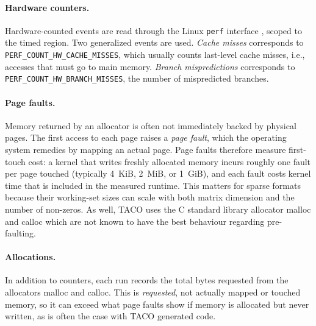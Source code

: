 \paragraph{Hardware counters.}
Hardware-counted events are read through the Linux \texttt{perf} interface
\cite{perf}, scoped to the timed region. Two generalized events are used.
\emph{Cache misses} corresponds to \texttt{PERF\_COUNT\_HW\_CACHE\_MISSES}, which
usually counts last-level cache misses, i.e., accesses that must go to main memory. \emph{Branch mispredictions} corresponds to
\texttt{PERF\_COUNT\_HW\_BRANCH\_MISSES}, the number of mispredicted branches.

\paragraph{Page faults.}
Memory returned by an allocator is often not immediately backed by physical pages.
The first access to each page raises a \emph{page fault}, which the operating
system remedies by mapping an actual page. Page faults therefore measure
first-touch cost: a kernel that writes freshly allocated memory incurs roughly one
fault per page touched (typically 4~KiB, 2~MiB, or 1~GiB), and each fault costs kernel time that is
included in the measured runtime. This matters for sparse formats because
their working-set sizes can scale with both matrix dimension and the number of non-zeros. As well, TACO uses the C standard library allocator malloc and calloc
which are not known to have the best behaviour regarding pre-faulting.

\paragraph{Allocations.}
In addition to counters, each run records the total bytes requested from the
allocators malloc and calloc. This is \emph{requested}, not actually mapped or touched memory,
so it can exceed what page faults show if memory is allocated but never written, as is often the case with TACO generated code.

